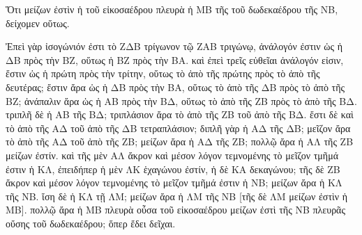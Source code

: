 \begin{Parallel}{}{}
{{\greekfont Ὅτι μείζων ἐστὶν ἡ τοῦ εἰκοσαέδρου πλευρὰ ἡ ΜΒ
τῆς τοῦ δωδεκαέδρου τῆς ΝΒ, δείχομεν οὕτως.}

{\greekfont Ἐπεὶ γὰρ ἰσογώνιόν ἐστι τὸ ΖΔΒ τρίγωνον τῷ
ΖΑΒ τριγώνῳ, ἀνάλογόν ἐστιν ὡς ἡ ΔΒ πρὸς
τὴν ΒΖ, οὕτως ἡ ΒΖ πρὸς τὴν ΒΑ. καὶ ἐπεὶ τρεῖς
εὐθεῖαι ἀνάλογόν εἰσιν, ἔστιν ὡς ἡ πρώτη πρὸς
τὴν τρίτην, οὕτως τὸ ἀπὸ τῆς πρώτης πρὸς τὸ ἀπὸ
τῆς δευτέρας;  ἔστιν ἄρα ὡς ἡ ΔΒ πρὸς τὴν ΒΑ, οὕτως
τὸ ἀπὸ τῆς ΔΒ πρὸς τὸ ἀπὸ τῆς ΒΖ; ἀνάπαλιν ἄρα ὡς ἡ ΑΒ
πρὸς τὴν ΒΔ, οὕτως τὸ ἀπὸ τῆς ΖΒ πρὸς τὸ ἀπὸ
τῆς ΒΔ. τριπλῆ δὲ ἡ ΑΒ τῆς ΒΔ; τριπλάσιον
ἄρα τὸ ἀπὸ τῆς ΖΒ τοῦ ἀπὸ τῆς ΒΔ. ἔστι
δὲ καὶ τὸ ἀπὸ τῆς ΑΔ τοῦ ἀπὸ τῆς ΔΒ τετραπλάσιον;
διπλῆ γὰρ ἡ ΑΔ τῆς ΔΒ; μεῖζον ἄρα τὸ ἀπὸ τῆς
ΑΔ τοῦ ἀπὸ τῆς ΖΒ; μείζων ἄρα ἡ ΑΔ τῆς ΖΒ;
πολλῷ ἄρα ἡ ΑΛ τῆς ΖΒ μείζων ἐστίν. καὶ τῆς
μὲν ΑΛ ἄκρον καὶ μέσον λόγον τεμνομένης τὸ μεῖζον
τμῆμά ἐστιν ἡ ΚΛ, ἐπειδήπερ ἡ μὲν ΛΚ ἑχαγώνου ἐστίν,
ἡ δὲ ΚΑ δεκαγώνου; τῆς δὲ ΖΒ ἄκρον καὶ μέσον
λόγον τεμνομένης τὸ μεῖζον τμῆμά ἐστιν ἡ ΝΒ; μείζων
ἄρα ἡ ΚΛ τῆς ΝΒ. ἴση δὲ ἡ ΚΛ τῇ ΛΜ; μείζων
ἄρα ἡ ΛΜ τῆς ΝΒ [τῆς δὲ ΛΜ μείζων ἐστὶν ἡ ΜΒ].
πολλῷ ἄρα ἡ ΜΒ πλευρὰ οὖσα τοῦ εἰκοσαέδρου μείζων
ἐστὶ τῆς ΝΒ πλευρᾶς οὔσης τοῦ δωδεκαέδρου; ὅπερ
ἔδει δεῖχαι.}}

\end{Parallel}
